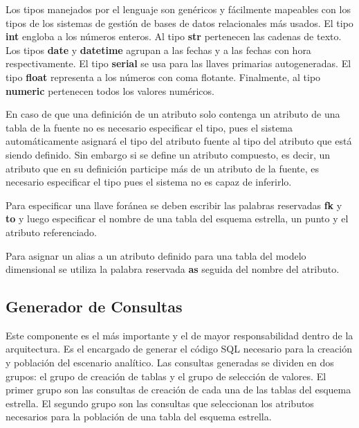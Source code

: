 Los tipos manejados por el lenguaje son genéricos y fácilmente mapeables con los tipos de los sistemas de 
gestión de bases de datos relacionales m\'as usados. El tipo \textbf{int} engloba a los n\'umeros enteros. 
Al tipo \textbf{str} pertenecen las cadenas de texto. Los tipos \textbf{date} y \textbf{datetime} agrupan a las fechas y a las fechas con 
hora respectivamente. El tipo \textbf{serial} se usa para las llaves primarias autogeneradas. El tipo \textbf{float} 
representa a los n\'umeros con coma flotante. Finalmente, al tipo \textbf{numeric} pertenecen todos los valores numéricos.

En caso de que una definición de un atributo solo contenga un atributo de una tabla de la fuente no es necesario 
especificar el tipo, pues el sistema automáticamente asignar\'a el tipo del atributo fuente al tipo del 
atributo que est\'a siendo definido. Sin embargo si se define un atributo compuesto, es decir, un atributo que 
en su definición participe m\'as de un atributo de la fuente, es necesario especificar el tipo pues el sistema 
no es capaz de inferirlo.

Para especificar una llave for\'anea se deben escribir las palabras reservadas \textbf{fk} y \textbf{to} y luego especificar 
el nombre de una tabla del esquema estrella, un punto y el atributo referenciado.

Para asignar un alias a un atributo definido para una tabla del modelo dimensional se utiliza la 
palabra reservada \textbf{as} seguida del nombre del atributo.


\subsection{Generador de Consultas}

Este componente es el m\'as importante y el de mayor responsabilidad dentro de la arquitectura. Es el encargado 
de generar el código SQL necesario para la creación y población del escenario analítico. Las consultas generadas 
se dividen en dos grupos: el grupo de creación de tablas y el grupo de selección de valores. El primer grupo 
son las consultas de creación de cada una de las tablas del esquema estrella. El segundo grupo son las  consultas 
que seleccionan los atributos necesarios para la población de una tabla del esquema estrella. 

